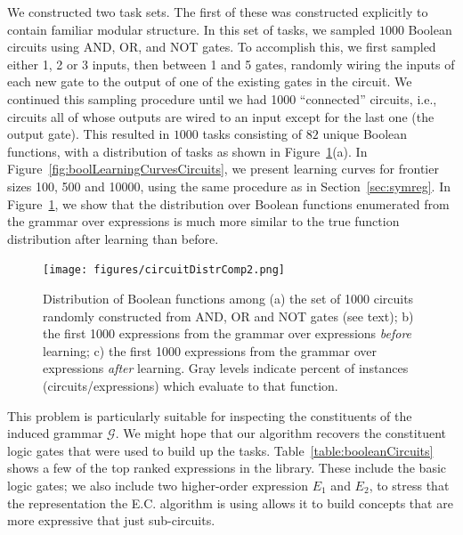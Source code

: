 \documentclass{article}
\begin{document}
We constructed two task sets. The first of these was constructed
explicitly to contain familiar modular structure. In this set of
tasks, we sampled $1000$ Boolean circuits using AND, OR, and NOT
gates. To accomplish this, we first sampled either 1, 2 or 3 inputs,
then between 1 and 5 gates, randomly wiring the inputs of each new
gate to the output of one of the existing gates in the circuit. We
continued this sampling procedure until we had 1000 ``connected''
circuits, i.e., circuits all of whose outputs are wired to an input
except for the last one (the output gate). This resulted in $1000$
tasks consisting of $82$ unique Boolean functions, with a distribution
of tasks as shown in Figure~\ref{fig:booldistr}(a). In
Figure~\ref{fig:boolLearningCurvesCircuits}, we present learning
curves for frontier sizes 100, 500 and 10000, using the same procedure
as in Section~\ref{sec:symreg}. In Figure~\ref{fig:booldistr}, we show
that the distribution over Boolean functions enumerated from the
grammar over expressions is much more similar to the true function
distribution after learning than before.

\begin{figure}
\texttt{[image: figures/circuitDistrComp2.png]}
\caption{Distribution of Boolean functions among (a) the set of 1000
  circuits randomly constructed from AND, OR and NOT gates (see text);
  b) the first 1000 expressions from the grammar over expressions
  \emph{before} learning; c) the first 1000 expressions from the
  grammar over expressions \emph{after} learning. Gray levels indicate
  percent of instances (circuits/expressions) which evaluate to that
  function.\label{fig:booldistr}}
\end{figure}

This problem is particularly suitable for inspecting the constituents
of the induced grammar $\mathcal{G}$. We might hope that our algorithm
recovers the constituent logic gates that were used to build up the
tasks. Table~\ref{table:booleanCircuits} shows a few of the top ranked
expressions in the library. These include the basic logic gates; we
also include two higher-order expression $E_1$ and $E_2$, to stress
that the representation the E.C. algorithm is using allows it to build
concepts that are more expressive that just sub-circuits.
\end{document}
